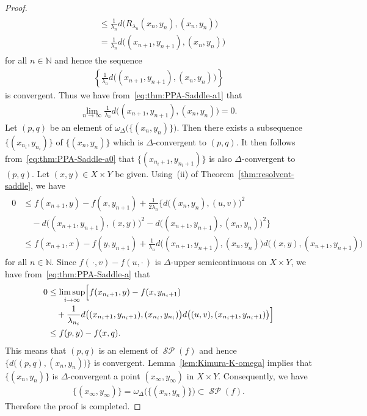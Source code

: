 \documentclass[draft]{amsart}
\numberwithin{equation}{section}
\def\N{\mathbb N}
\DeclareMathOperator{\Saddle}{\mathcal{SP}}
\theoremstyle{plain}
\theoremstyle{definition}
\theoremstyle{remark}
\begin{document}
\begin{proof}
\begin{align}
\begin{split}
 &\leq 
    \frac{1}{\lambda_{n}} 
  d\bigl(R_{\lambda_n}(x_{n},y_{n}),(x_{n},y_{n})\bigr) \\
 &= \frac{1}{\lambda_{n}} 
  d\bigl((x_{n+1},y_{n+1}),(x_{n},y_{n})\bigr)  
 \end{split}
 \end{align}
 for all $n\in \N$ and hence the sequence 
 \begin{align}
  \left\{\frac{1}{\lambda_{n}}d\bigl((x_{n+1},y_{n+1}),(x_{n},y_{n})\bigr)\right\}
 \end{align}
 is convergent. Thus we have from~\eqref{eq:thm:PPA-Saddle-a1} that 
 \begin{align}\label{eq:thm:PPA-Saddle-a}
\lim_{n\to \infty} 
\frac{1}{\lambda_n} d\bigl((x_{n+1},y_{n+1}),(x_{n},y_{n})\bigr) 
 =0. 
 \end{align} 
 Let $(p,q)$ be an element of $\omega_{\Delta}\bigl(\{(x_n,y_n)\}\bigr)$. 
 Then there exists a subsequence $\{(x_{n_i},y_{n_i})\}$ of $\{(x_n,y_n)\}$ 
 which is $\Delta$-convergent to $(p,q)$. 
 It then follows from~\eqref{eq:thm:PPA-Saddle-a0} that 
 $\{(x_{n_i+1},y_{n_i+1})\}$ is also $\Delta$-convergent to $(p,q)$. 
 Let $(x,y)\in X\times Y$ be given. 
 Using~(ii) of Theorem~\ref{thm:resolvent-saddle}, we have 
 \begin{align}
 \begin{split}
  0
  &\leq f(x_{n+1},y)-f(x,y_{n+1}) +\frac{1}{2\lambda_n}\bigl\{d\bigl((x_n,y_n),(u,v)\bigr)^2 \\
  &\quad -d\bigl((x_{n+1},y_{n+1}),(x,y)\bigr)^2 
 -d\bigl((x_{n+1},y_{n+1}),(x_n,y_n)\bigr)^2\bigr\} \\
  &\leq f(x_{n+1},x)-f(y,y_{n+1}) 
 +\frac{1}{\lambda_n}d\bigl((x_{n+1},y_{n+1}),(x_n,y_n)\bigr)
d\bigl((x,y),(x_{n+1},y_{n+1})\bigr)  
 \end{split}
 \end{align}
 for all $n\in \N$. 
 Since $f(\,\cdot,v)-f(u,\cdot\,)$ is $\Delta$-upper semicontinuous on $X\times Y$, 
 we have from~\eqref{eq:thm:PPA-Saddle-a} that 
 \begin{align}
 \begin{split}
  0
  &\leq \limsup_{i\to \infty} 
  \Bigl[
 f(x_{n_i+1},y)-f(x,y_{n_i+1})  \\
  &\quad +\frac{1}{\lambda_{n_i}}d\bigl((x_{n_i+1},y_{n_i+1}),(x_{n_i},y_{n_i})\bigr)
d\bigl((u,v),(x_{n_i+1},y_{n_i+1})\bigr)
  \Bigr] \\
  &\leq f(p,y)-f(x,q).   
 \end{split}
 \end{align}
 This means that $(p,q)$ is an element of $\Saddle(f)$ 
 and hence $\{d\bigl((p,q),(x_{n},y_{n})\bigr)\}$ 
 is convergent. 
 Lemma~\ref{lem:Kimura-K-omega} implies that 
 $\{(x_n,y_n)\}$ is $\Delta$-convergent 
 a point $(x_{\infty},y_{\infty})$ 
 in $X\times Y$. 
 Consequently, we have 
 \begin{align}
  \{(x_{\infty},y_{\infty})\} =\omega_{\Delta}\bigl(\{(x_n,y_n)\}\bigr) 
  \subset \Saddle (f). 
 \end{align}
 Therefore the proof is completed. 
\end{proof}
\end{document}
